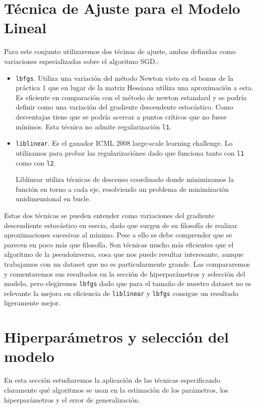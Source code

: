 \documentclass[11pt,a4paper]{article}
\begin{document}
\section{ Técnica de Ajuste para el Modelo Lineal}
Para este conjunto utilizaremos dos técinas de ajuste, ambas definidas como variaciones especializadas sobre el algoritmo SGD.:
\begin{itemize}
	\item \texttt{lbfgs}. Utiliza una variación del método Newton visto en el bonus de la práctica 1 que en lugar de la matriz Hessiana utiliza una aproximación a esta. Es eficiente en comparación con el método de newton estandard y se podría definir como una variación del gradiente descendente estocástico. Como desventajas tiene que se podría acercar a puntos críticos que no fuese mínimos. Esta técnica no admite regularización \texttt{l1}.
	\item \texttt{liblinear}. Es el ganador ICML 2008 large-scale learning challenge. Lo utilizamos para probar las regularizaciónes dado que funciona tanto con \texttt{l1} como con \texttt{l2}.
	
	Liblinear utiliza técnicas de descenso coordinado\cite{CD} donde minimizamos la función en torno a cada eje, resolviendo un problema de minimización unidimensional en bucle. 
\end{itemize}

Estas dos técnicas se pueden entender como variaciones del gradiente descendiente estocástico en esecia, dado que surgen de su filosofía de realizar aproximaciones sucesivas al mínimo. Pese a ello se debe comprender que se parecen en poco más que filosofía. Son técnicas mucho más eficientes que el algoritmo de la pseudoinversa, cosa que nos puede resultar interesante, aunque trabajamos con un dataset que no es particularmente grande. Las compararemos y comentaremos sus resultados  en la sección de hiperparámetros y selección del modelo, pero elegiremos \texttt{lbfgs} dado que para el tamaño de nuestro dataset no es relevante la mejora en eficiencia de \texttt{liblinear} y \texttt{lbfgs} consigue un resultado ligeramente mejor.


\section{Hiperparámetros y selección del modelo}
 En esta sección estudiaremos la aplicación de las técnicas especificando claramente qué algoritmos se usan en la estimación de los parámetros, los hiperparámetros y el error de generalización.\\
 
\end{document}
